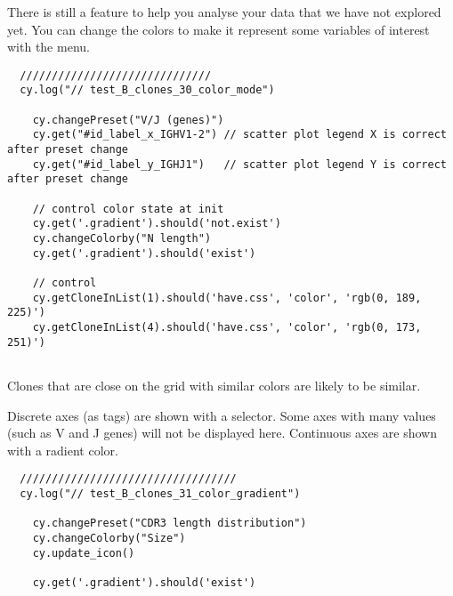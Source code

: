 There is still a feature to help you analyse your data that we have not
explored yet.
You can change the colors to make it represent some variables of interest
with the  menu.
\begin{verbatim}
  //////////////////////////////
  cy.log("// test_B_clones_30_color_mode")

    cy.changePreset("V/J (genes)")
    cy.get("#id_label_x_IGHV1-2") // scatter plot legend X is correct after preset change
    cy.get("#id_label_y_IGHJ1")   // scatter plot legend Y is correct after preset change

    // control color state at init
    cy.get('.gradient').should('not.exist')
    cy.changeColorby("N length")
    cy.get('.gradient').should('exist')

    // control
    cy.getCloneInList(1).should('have.css', 'color', 'rgb(0, 189, 225)')
    cy.getCloneInList(4).should('have.css', 'color', 'rgb(0, 173, 251)')


\end{verbatim}
  
Clones that are close on the grid with similar colors are likely to
be similar.

Discrete axes (as tags) are shown with a selector.
Some axes with many values (such as V and J genes) will not be displayed here.
Continuous axes are shown with a radient color.
\begin{verbatim}
  //////////////////////////////////
  cy.log("// test_B_clones_31_color_gradient")

    cy.changePreset("CDR3 length distribution")
    cy.changeColorby("Size")
    cy.update_icon()

    cy.get('.gradient').should('exist')


\end{verbatim}

